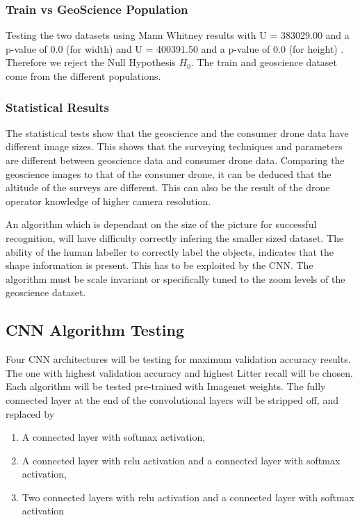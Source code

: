 \documentclass{article}
\begin{document}
\subsubsection{Train vs GeoScience Population}

Testing the two datasets using Mann Whitney results with U = 383029.00 and a p-value of 0.0 (for width) and U = 400391.50 and a p-value of 0.0 (for height) . Therefore we reject the Null Hypothesis $H_0$. The train and geoscience dataset come from the different populations. 

\subsubsection{Statistical Results}

The statistical tests show that the geoscience and the consumer drone data have different image sizes. This shows that the surveying techniques and parameters are different between geoscience data and consumer drone data. Comparing the geoscience images to that of the consumer drone, it can be deduced that the altitude of the surveys are different. This can also be the result of the drone operator knowledge of higher camera resolution.\newline

An algorithm which is dependant on the size of the picture for successful recognition, will have difficulty correctly infering the smaller sized dataset. The ability of the human labeller to correctly label the objects, indicates that the shape information is present. This has to be exploited by the CNN. The algorithm must be scale invariant or specifically tuned to the zoom levels of the geoscience dataset.\newline

\subsection{CNN Algorithm Testing}

Four CNN architectures will be testing for maximum validation accuracy results. The one with highest validation accuracy and highest Litter recall will be chosen. Each algorithm will be tested pre-trained with Imagenet weights. The fully connected layer at the end of the convolutional layers will be stripped off, and replaced by
\begin{enumerate}
\item A connected layer with softmax activation,
\item A connected layer with relu activation and a connected layer with softmax activation,
\item Two connected layers with relu activation and a connected layer with softmax activation
\end{enumerate}
\end{document}
